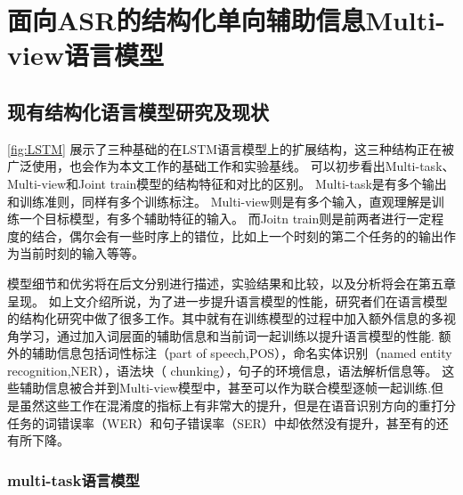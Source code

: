 

\chapter{面向ASR的结构化单向辅助信息Multi-view语言模型}
\label{chap:struclm}




\section{现有结构化语言模型研究及现状} 
\label{sec:struclm}

\ref{fig:LSTM} 展示了三种基础的在LSTM语言模型上的扩展结构，这三种结构正在被广泛使用，也会作为本文工作的基础工作和实验基线。 
可以初步看出Multi-task、Multi-view和Joint train模型的结构特征和对比的区别。
Multi-task是有多个输出和训练准则，同样有多个训练标注。
Multi-view则是有多个输入，直观理解是训练一个目标模型，有多个辅助特征的输入。
而Joitn train则是前两者进行一定程度的结合，偶尔会有一些时序上的错位，比如上一个时刻的第二个任务的的输出作为当前时刻的输入等等。

模型细节和优劣将在后文分别进行描述，实验结果和比较，以及分析将会在第五章呈现。
如上文介绍所说，为了进一步提升语言模型的性能，研究者们在语言模型的结构化研究中做了很多工作。其中就有在训练模型的过程中加入额外信息的多视角学习，通过加入词层面的辅助信息和当前词一起训练以提升语言模型的性能\cite{shi2012towards}. 
额外的辅助信息包括词性标注（part of speech,POS），命名实体识别（named entity recognition,NER），语法块（ chunking）\cite{Tjong2000Introduction}，句子的环境信息，语法解析信息等。
这些辅助信息被合并到Multi-view模型中，甚至可以作为联合模型逐帧一起训练\cite{shi2015integrating}.但是虽然这些工作在混淆度的指标上有非常大的提升，但是在语音识别方向的重打分任务的词错误率（WER）和句子错误率（SER）中却依然没有提升，甚至有的还有所下降\cite{shi2012towards}\cite{shi2015integrating}。



\subsection{multi-task语言模型}

